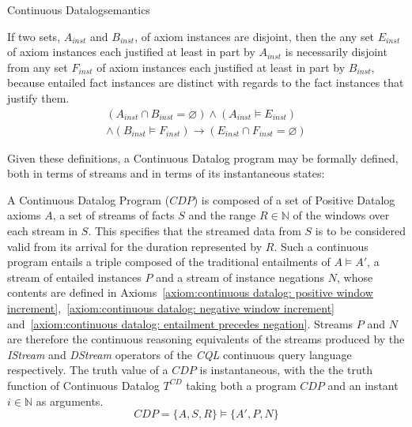 \begin{nestedsection}{Continuous Datalog}{semantics}
\begin{axiom}
\label{axiom:continuous datalog: entailment disjointness}
If two sets, $A_{inst}$ and $B_{inst}$, of axiom instances are
disjoint, then the any set $E_{inst}$ of axiom instances each
justified at least in part by $A_{inst}$ is necessarily disjoint from
any set $F_{inst}$ of axiom instances each justified at least in part
by $B_{inst}$, because entailed fact instances are distinct with
regards to the fact instances that justify them.
\begin{multline*}
\left( A_{inst} \cap B_{inst} = \varnothing \right) \wedge \left( A_{inst} \vDash E_{inst} \right) \\
\wedge \left( B_{inst} \vDash F_{inst} \right) \rightarrow \left( E_{inst} \cap F_{inst} = \varnothing \right)
\end{multline*}
\end{axiom}

	Given these definitions, a Continuous Datalog program may be formally defined, both in terms of streams and in terms of its instantaneous states:

\begin{definition}
\label{def:continuous datalog: CDP}

A Continuous Datalog Program (${CDP}$) is composed of a set of
Positive Datalog axioms $A$, a set of streams of facts $S$ and the
range ${R \in \mathbb{N}}$ of the windows over each stream in $S$.
This specifies that the streamed data from $S$ is to be considered
valid from its arrival for the duration represented by $R$.  Such a
continuous program entails a triple composed of the traditional
entailments of ${A \vDash A'}$, a stream of entailed instances $P$ and
a stream of instance negations $N$, whose contents are defined in
Axioms~\ref{axiom:continuous datalog: positive window
  increment},~\ref{axiom:continuous datalog: negative window
  increment} and~\ref{axiom:continuous datalog: entailment precedes
  negation}.  Streams $P$ and $N$ are therefore the continuous
reasoning equivalents of the streams produced by the \emph{IStream}
and \emph{DStream} operators of the \emph{CQL} continuous query
language \citep{CQL} respectively.  The truth value of a ${CDP}$ is
instantaneous, with the the truth function of Continuous Datalog
$T^{CD}$ taking both a program ${CDP}$ and an instant ${i \in
  \mathbb{N}}$ as arguments.
\begin{equation*}
CDP = \{A,S,R\} \vDash \{A',P,N\}
\end{equation*}
\end{definition}


\end{nestedsection}
